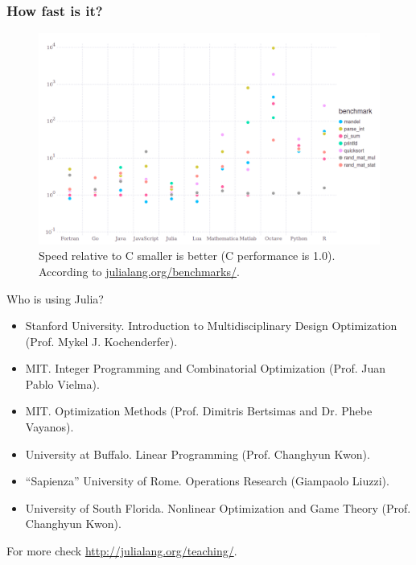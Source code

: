 \documentclass{beamer}
\begin{document}
\begin{frame}
  \frametitle{How fast is it?}
  \begin{figure}[htpb]
    \centering
    \includegraphics[scale=0.2]{images/BenchmarkImage.png}
    \caption{Speed relative to C smaller is better (C performance is 1.0). According to \url{julialang.org/benchmarks/}.}
    \label{fig:benchmark}
  \end{figure}
\end{frame}

\begin{frame}{Who is using Julia?}
  \begin{itemize}\footnotesize
  \item[] Stanford University. Introduction to Multidisciplinary Design Optimization (Prof. Mykel J. Kochenderfer).
  \item[] MIT. Integer Programming and Combinatorial Optimization (Prof. Juan Pablo Vielma).
  \item[] MIT. Optimization Methods (Prof. Dimitris Bertsimas and Dr. Phebe Vayanos).
  \item[] University at Buffalo. Linear Programming (Prof. Changhyun Kwon).
  \item[] “Sapienza” University of Rome. Operations Research (Giampaolo Liuzzi).
    \item[] University of South Florida. Nonlinear Optimization and Game Theory (Prof. Changhyun Kwon).
    \end{itemize}

    \footnotesize{For more check \url{http://julialang.org/teaching/}.}
\end{frame}
\end{document}
